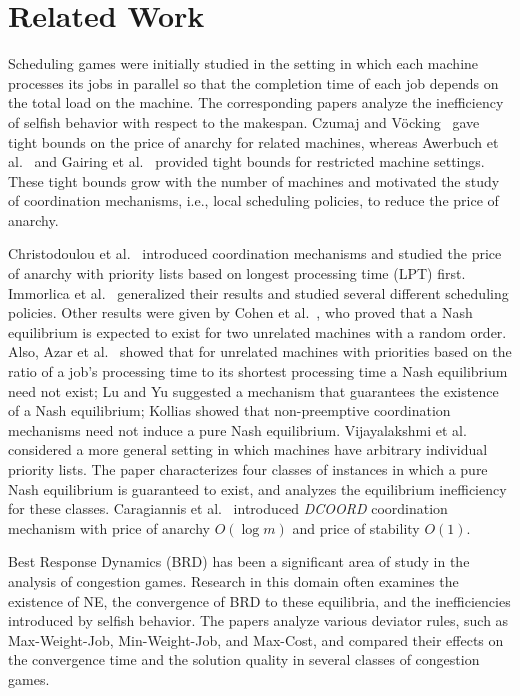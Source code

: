 \section{Related Work}
Scheduling games were initially studied in the setting in which each machine processes its jobs in parallel so that the completion time of each job depends on the total load on the machine. The corresponding papers analyze the inefficiency of selfish behavior with respect to the makespan. Czumaj and Vöcking~\cite{CzumajV07} gave tight bounds on the price of anarchy for related machines, whereas Awerbuch et al.~\cite{AART06} and Gairing et al.~\cite{GLM10} provided tight bounds for restricted machine settings. %
These tight bounds grow with the number of machines and motivated the study of coordination mechanisms, i.e., local scheduling policies, to reduce the price of anarchy.

Christodoulou et al.~\cite{CKN04} introduced coordination mechanisms and studied the price of anarchy with priority lists based on longest processing time (LPT) first. Immorlica et al.~\cite{ILMS09} generalized their results and studied several different scheduling policies. Other results were given by Cohen et al.~\cite{CDN11}, who proved that a Nash equilibrium is expected to exist for two unrelated machines with a random order. Also, Azar et al.~\cite{AJM08} showed that for unrelated machines with priorities based on the ratio of a job's processing time to its shortest processing time a Nash equilibrium need not exist; Lu and Yu \cite{LY12} suggested a mechanism that guarantees the existence of a Nash equilibrium; Kollias \cite{K13} showed that non-preemptive coordination mechanisms need not induce a pure Nash equilibrium. Vijayalakshmi et al.~\cite{RST21} considered a more general setting in which machines have arbitrary individual priority lists. The paper characterizes four classes of instances in which a pure Nash equilibrium is guaranteed to exist, and analyzes the equilibrium inefficiency for these classes. Caragiannis et al.~\cite{CF19} introduced {\em DCOORD} coordination mechanism with price of anarchy $O(\log m)$ and price of stability $O(1)$.

Best Response Dynamics (BRD) has been a significant area of study in the analysis of congestion games.
Research in this domain often examines the existence of NE, the convergence of BRD to these equilibria, and the inefficiencies introduced by selfish behavior. The papers \cite{EKM03,FT15,FST17,KBL13} analyze various deviator rules, such as Max-Weight-Job, Min-Weight-Job, and Max-Cost, and compared their effects on the convergence time and the solution quality in several classes of congestion games.

